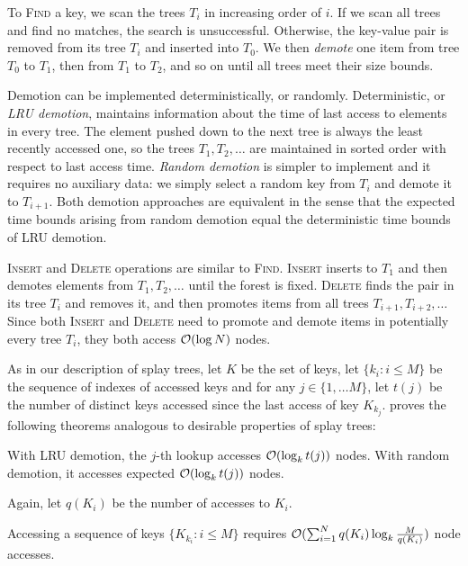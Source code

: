 To \textsc{Find} a key, we scan the trees $T_i$ in increasing order of $i$.
If we scan all trees and find no matches, the search is unsuccessful.
Otherwise, the key-value pair is removed from its tree $T_i$ and inserted
into $T_0$. We then \emph{demote} one item from tree $T_0$ to $T_1$,
then from $T_1$ to $T_2$, and so on until all trees meet their size bounds.

Demotion can be implemented deterministically, or randomly.
Deterministic, or \emph{LRU demotion}, maintains information about the time
of last access to elements in every tree. The element pushed down to the next
tree is always the least recently accessed one, so the trees $T_1,T_2,\ldots$
are maintained in sorted order with respect to last access time.
\emph{Random demotion} is simpler to implement and it requires no auxiliary
data: we simply select a random key from $T_i$ and demote it to $T_{i+1}$.
Both demotion approaches are equivalent in the sense that the expected time
bounds arising from random demotion equal the deterministic time bounds of
LRU demotion.

\textsc{Insert} and \textsc{Delete} operations are similar to \textsc{Find}.
\textsc{Insert} inserts to $T_1$ and then demotes elements from $T_1,T_2,\ldots$
until the forest is fixed.
\textsc{Delete} finds the pair in its tree $T_i$ and removes it, and
then promotes items from all trees $T_{i+1},T_{i+2},\ldots$
Since both \textsc{Insert} and \textsc{Delete} need to promote and demote items
in potentially every tree $T_i$, they both access $\mathcal{O}(\log N)$ nodes.

As in our description of splay trees, let $K$ be the set of keys,
let $\{k_i: i\leq M\}$ be the sequence of indexes of accessed keys and
for any $j\in\{1,\ldots M\}$, let $t(j)$ be the number of distinct
keys accessed since the last access of key $K_{k_j}$.
\cite{martel} proves the following theorems analogous to desirable properties
of splay trees:
\begin{theorem}
	With LRU demotion, the $j$-th lookup accesses $\mathcal{O}(\log_k t(j))$ nodes.
	With random demotion, it accesses expected $\mathcal{O}(\log_k t(j))$ nodes.
\end{theorem}

Again, let $q(K_i)$ be the number of accesses to $K_i$.
\begin{theorem}
	Accessing a sequence of keys $\{K_{k_i}: i\leq M\}$ requires
	$\mathcal{O}(\sum_{i=1}^N q(K_i) \log_k \frac{M}{q(K_i)})$ node accesses.
\end{theorem}

